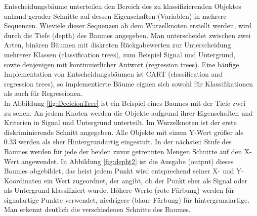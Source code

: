 Entscheidungsb\"aume unterteilen den Bereich des zu klassifizierenden Objektes anhand gerader Schnitte auf dessen Eigenschaften (Variablen) in mehrere Sequenzen. Wieviele dieser Sequenzen ab dem Wurzelknoten erstellt werden, wird durch die Tiefe (depth) des Baumes angegeben. Man unterscheidet zwischen zwei Arten, bin\"aren B\"aumen mit diskreten R\"uckgabewerten zur Unterscheidung mehrerer Klassen (classification trees), zum Beispiel Signal und Untergrund, sowie denjenigen mit kontinuierlicher Antwort (regression trees). \cite{SWB-455193959} Eine h\"aufige Implementation von Entscheidungsb\"aumen ist CART (classification and regression trees), so implementierte B\"aume eignen sich sowohl f\"ur Klassifikationen als auch f\"ur Regressionen.\\
In Abbildung \ref{fig:DecicionTree} ist ein Beispiel eines Baumes mit der Tiefe zwei zu sehen. An jedem Knoten werden die Objekte aufgrund ihrer Eigenschaften und Kriterien in Signal und Untergrund unterteilt. Im Wurzelknoten ist der erste diskriminierende Schnitt angegeben. Alle Objekte mit einem Y-Wert gr\"o\ss er als 0.33 werden als eher Hintergrundartig eingestuft. In der n\"achsten Stufe des Baumes werden f\"ur jede der beiden zuvor getrennten Mengen Schnitte auf den X-Wert angewendet. In Abbildung \ref{fig:depht2} ist die Ausgabe (output) dieses Baumes abgebildet, das heist jedem Punkt wird entsprechend seiner X- und Y-Koordinaten ein Wert zugeordnet, der angibt, ob der Punkt eher als Signal oder als Untergrund klassifiziert wurde. H\"ohere Werte (rote F\"arbung) werden f\"ur signalartige Punkte verwendet, niedrigere (blaue F\"arbung) f\"ur hintergrundartige. Man erkennt deutlich die verschiedenen Schnitte des Baumes.\\


